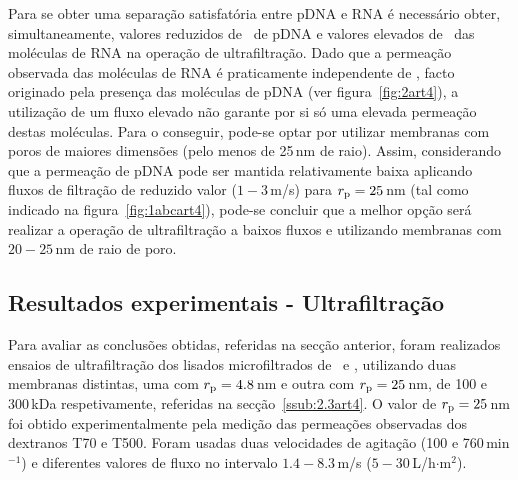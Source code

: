 Para se obter uma separação satisfatória entre pDNA e RNA é necessário obter, simultaneamente, valores reduzidos de \permobs\ de pDNA e valores elevados de \permobs\ das moléculas de RNA na operação de ultrafiltração. Dado que a permeação observada das moléculas de RNA é praticamente independente de \fluxo, facto originado pela presença das moléculas de pDNA (ver figura~\ref{fig:2art4}), a utilização de um fluxo elevado não garante por si só uma elevada permeação destas moléculas. Para o conseguir, pode-se optar por utilizar membranas com poros de maiores dimensões (pelo menos de 25\,nm de raio). Assim, considerando que a permeação de pDNA pode ser mantida relativamente baixa aplicando fluxos de filtração de reduzido valor ($1-3$\,\micro m/s) para $r_{\mathrm{p}} = 25$\,nm (tal como indicado na figura~\ref{fig:1abcart4}), pode-se concluir que a melhor opção será realizar a operação de ultrafiltração a baixos fluxos e utilizando membranas com $20-25$\,nm de raio de poro.   

\subsection{Resultados experimentais - Ultrafiltração} %
\label{sub:3.2art4}
%
Para avaliar as conclusões obtidas, referidas na secção anterior, foram realizados ensaios de ultrafiltração dos lisados microfiltrados de \pVAX\ e \pCAMBIA, utilizando duas membranas distintas, uma com $r_{\mathrm{p}}=4.8$\,nm \cite{moraompa} e outra com $r_{\mathrm{p}}=25$\,nm, de 100 e 300\,kDa respetivamente, referidas na secção~\ref{ssub:2.3art4}.
%
%
%
%
O valor de $r_{\mathrm{p}}=25$\,nm foi obtido experimentalmente pela medição das permeações observadas dos dextranos T70 e T500. Foram usadas duas velocidades de agitação (100 e 760\,min$^{-1}$) e diferentes valores de fluxo no intervalo $1.4-8.3$\,\micro m/s ($5-30$\,L/h$\cdot$m$^2$).
%
%

